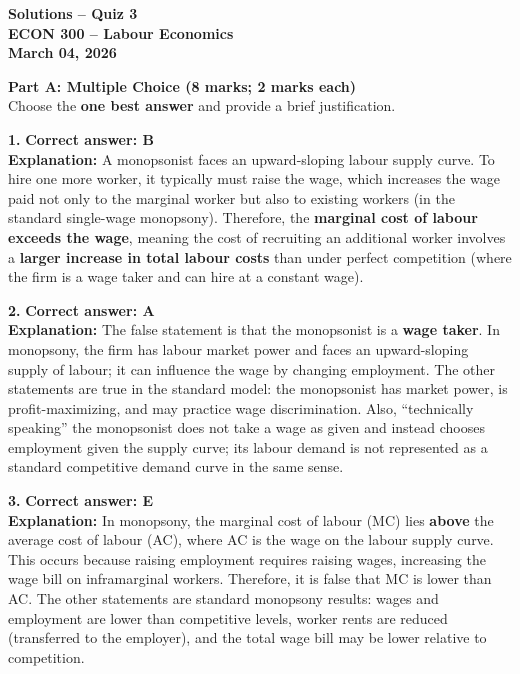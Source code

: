 \documentclass[12pt]{article}
\begin{document}
\begin{center}
\Large \textbf{Solutions -- Quiz 3\\ \vspace{0.6em}ECON 300 -- Labour Economics}\\

\vspace{0.6em}
\normalsize \textbf{March 04, 2026}
\end{center}

\vspace{0.5em}

\textbf{Part A: Multiple Choice (8 marks; 2 marks each)}\\
Choose the \textbf{one best answer} and provide a brief justification.

\vspace{0.6em}

\textbf{1.} \textbf{Correct answer: B}\\
\textbf{Explanation:} A monopsonist faces an upward-sloping labour supply curve. To hire one more worker, it typically must raise the wage, which increases the wage paid not only to the marginal worker but also to existing workers (in the standard single-wage monopsony). Therefore, the \textbf{marginal cost of labour exceeds the wage}, meaning the cost of recruiting an additional worker involves a \textbf{larger increase in total labour costs} than under perfect competition (where the firm is a wage taker and can hire at a constant wage).

\vspace{0.6em}

\textbf{2.} \textbf{Correct answer: A}\\
\textbf{Explanation:} The false statement is that the monopsonist is a \textbf{wage taker}. In monopsony, the firm has labour market power and faces an upward-sloping supply of labour; it can influence the wage by changing employment. The other statements are true in the standard model: the monopsonist has market power, is profit-maximizing, and may practice wage discrimination. Also, ``technically speaking'' the monopsonist does not take a wage as given and instead chooses employment given the supply curve; its labour demand is not represented as a standard competitive demand curve in the same sense.

\vspace{0.6em}

\textbf{3.} \textbf{Correct answer: E}\\
\textbf{Explanation:} In monopsony, the marginal cost of labour (MC) lies \textbf{above} the average cost of labour (AC), where AC is the wage on the labour supply curve. This occurs because raising employment requires raising wages, increasing the wage bill on inframarginal workers. Therefore, it is false that MC is lower than AC. The other statements are standard monopsony results: wages and employment are lower than competitive levels, worker rents are reduced (transferred to the employer), and the total wage bill may be lower relative to competition.
\end{document}

